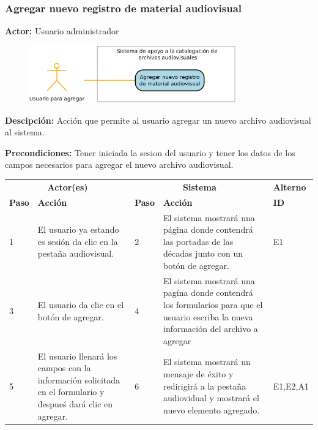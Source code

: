 \documentclass[10pt,letterpaper]{article}
\begin{document}
\subsubsection{Agregar nuevo registro de material audiovisual}
\textbf{Actor:} Usuario administrador

\begin{figure}[H]
	\centering
	\includegraphics[width=0.8\textwidth]{CasoDeUso_Agregar_AgregarNuevoRegistro.png}
\end{figure}

\textbf{Descipción: } Acción que permite al usuario agregar un nuevo archivo audiovisual al sistema.

\textbf{Precondiciones:} Tener iniciada la sesion del usuario y tener los datos de los campos necesarios para agregar el nuevo archivo audiovisual.

\begin{adjustwidth}{-6em}{-6em}
	\begin{center}
		\begin{tabularx}{1.2\textwidth}{ | p{0.7cm} | X | p{0.7cm} | X | p{1.5cm} | }
			\hline
			\rowcolor{NewBlue} \multicolumn{5}{|c|}{\textbf{Flujo normal de eventos}} \\
			\hline
			\multicolumn{2}{|c|}{\textbf{Actor(es)}}	&	\multicolumn{2}{c|}{\textbf{Sistema}}	&	\textbf{Alterno} \\
			\hline
			\textbf{Paso}	&	\textbf{Acción}	&	\textbf{Paso}	&	\textbf{Acción}	&	\textbf{ID} \\
			\hline
			1 & 
			 El usuario ya estando es sesión da clic en la pestaña audiovisual.&
			2 &
			El sistema mostrará una página donde contendrá las portadas de las décadas junto con un botón de agregar.&
			E1
			\\
			\hline
			3 & 
			 El usuario da clic en el botón de agregar.&
			4 &
			El sistema mostrará una pagína donde contendrá los formularios para que el usuario escriba la nueva información del archivo a agregar&
			\\
			\hline
			5 & 
			 El usuario llenará los campos con la información solicitada en el formulario y despueś dará clic en agregar.&
			6 &
			El sistema mostrará un mensaje de éxito y redirigirá a la pestaña audiovidual y mostrará el nuevo elemento agregado.&
			E1,E2,A1
			\\
			\hline
		\end{tabularx}
	\end{center}
\end{adjustwidth}
\end{document}

